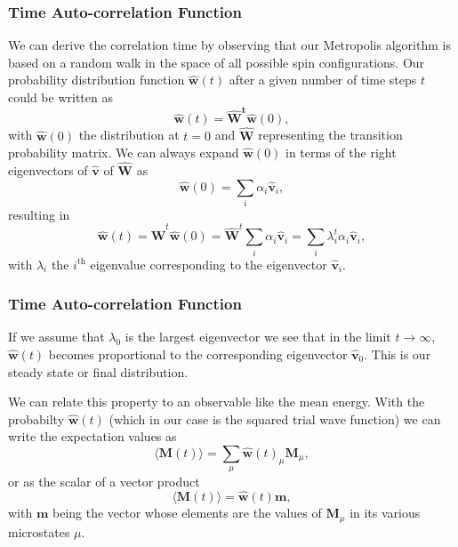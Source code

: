 \documentclass{beamer}
\begin{document}
\begin{frame}
\frametitle{Time Auto-correlation Function}

\begin{block}{}
We can derive the correlation time by observing that our Metropolis algorithm is based on a random
walk in the space of all  possible spin configurations. 
Our probability 
distribution function $\mathbf{\hat{w}}(t)$ after a given number of time steps $t$ could be written as
\[
   \mathbf{\hat{w}}(t) = \mathbf{\hat{W}^t\hat{w}}(0),
\]
with $\mathbf{\hat{w}}(0)$ the distribution at $t=0$ and $\mathbf{\hat{W}}$ representing the 
transition probability matrix. 
We can always expand $\mathbf{\hat{w}}(0)$ in terms of the right eigenvectors of 
$\mathbf{\hat{v}}$ of $\mathbf{\hat{W}}$ as 
\[
    \mathbf{\hat{w}}(0)  = \sum_i\alpha_i\mathbf{\hat{v}}_i,
\]
resulting in 
\[
   \mathbf{\hat{w}}(t) = \mathbf{\hat{W}}^t\mathbf{\hat{w}}(0)=\mathbf{\hat{W}}^t\sum_i\alpha_i\mathbf{\hat{v}}_i=
\sum_i\lambda_i^t\alpha_i\mathbf{\hat{v}}_i,
\]
with $\lambda_i$ the $i^{\mathrm{th}}$ eigenvalue corresponding to  
the eigenvector $\mathbf{\hat{v}}_i$. 
\end{block}
\end{frame}

\begin{frame}
\frametitle{Time Auto-correlation Function}

\begin{block}{}
If we assume that $\lambda_0$ is the largest eigenvector we see that in the limit $t\rightarrow \infty$,
$\mathbf{\hat{w}}(t)$ becomes proportional to the corresponding eigenvector 
$\mathbf{\hat{v}}_0$. This is our steady state or final distribution. 

We can relate this property to an observable like the mean energy.
With the probabilty $\mathbf{\hat{w}}(t)$ (which in our case is the squared trial wave function) we
can write the expectation values as 
\[
 \langle \mathbf{M}(t) \rangle  = \sum_{\mu} \mathbf{\hat{w}}(t)_{\mu}\mathbf{M}_{\mu},
\] 
or as the scalar of a  vector product
 \[
 \langle \mathbf{M}(t) \rangle  = \mathbf{\hat{w}}(t)\mathbf{m},
\] 
with $\mathbf{m}$ being the vector whose elements are the values of $\mathbf{M}_{\mu}$ in its 
various microstates $\mu$.
\end{block}
\end{frame}
\end{document}
